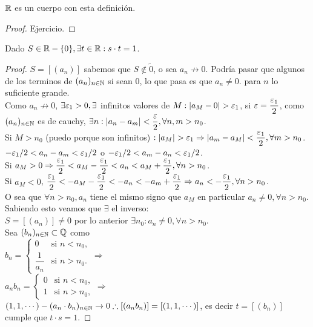 \begin{prop}
  $\mathbb{R}$ es un cuerpo con esta definición.
  \begin{proof}
    Ejercicio.
  \end{proof}
\end{prop}

\begin{theorem}
  Dado $S \in \mathbb{R} - \{0\}, \exists t \in \mathbb{R} : s \cdot t = 1$.
  \begin{proof}
    $S = [(a_n)]$ sabemos que $S \notin \tilde{0}$, o sea $a_n \not \to 0$. Podría pasar que algunos de los terminos de $(a_n)_{n \in \mathbb{N}}$ si sean $0$, lo que pasa es que $a_n \neq 0.$ para $n$ lo suficiente grande. \\
    Como $a_n \not \to 0$, $\exists \varepsilon_1 > 0, \exists$ infinitos valores de $M: |a_M - 0| > \varepsilon_1$, si $\varepsilon = \dfrac{\varepsilon_1}{2}$, como $(a_n)_{n \in \mathbb{N}}$ es de cauchy, $\exists n : |a_n - a_m| < \dfrac{\varepsilon}{2}, \forall n, m > n_0$. \\
    Si $M > n_0$ (puedo porque son infinitos) $: |a_M| > \varepsilon_1 \Rightarrow |a_m - a_M| < \dfrac{\varepsilon_1}{2}, \forall m > n_0$. \\
    $-\varepsilon_1/2 < a_n - a_m < \varepsilon_1 / 2$ o $-\varepsilon_1 / 2 < a_m - a_n < \varepsilon_1 / 2$. \\
    Si $a_M > 0 \Rightarrow \dfrac{\varepsilon_1}{2} < a_M - \dfrac{\varepsilon_1}{2} < a_n < a_M + \dfrac{\varepsilon_1}{2}, \forall n > n_0$. \\
    Si $a_M < 0$, $\dfrac{\varepsilon_1}{2} < -a_M - \dfrac{\varepsilon_1}{2} < -a_n<-a_m+ \dfrac{\varepsilon_1}{2} \Rightarrow a_n < -\dfrac{\varepsilon_1}{2}, \forall n > n_0$. \\
    O sea que $\forall n > n_0, a_n$ tiene el mismo signo que $a_M$ en particular $a_n \neq 0, \forall n > n_0$. \\
    Sabiendo esto veamos que $\exists$ el inverso: \\
    $S = [(a_n)] \neq 0$ por lo anterior $\exists n_0 : a_n \neq 0, \forall n > n_0$. \\
    Sea $(b_n)_{n \in \mathbb{N}} \subset \mathbb{Q}$ como \\
    $b_n = \begin{cases}
        0              & \text{si } n < n_0, \\
        \dfrac{1}{a_n} & \text{si } n > n_0.
      \end{cases} \Rightarrow$ \\

    $a_n b_n = \begin{cases}
        0 & \text{si } n < n_0, \\
        1 & \text{si } n > n_0,
      \end{cases} \Rightarrow$ \\

    $(1, 1, \cdots) - (a_n \cdot b_n)_{n \in \mathbb{N}} \to 0 \therefore [(a_n b_n)] = [(1, 1, \cdots)]$, es decir $t = [(b_n)]$ cumple que $t \cdot s = 1$.
  \end{proof}
\end{theorem}

